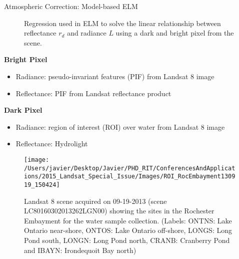 \documentclass{beamer}
\begin{document}
\begin{frame}{}
\begin{columns}[t]
\begin{column}{.3\linewidth}
\begin{block}{Atmospheric Correction: Model-based ELM}
\begin{figure}[htb]
{
  }%
\caption{Regression used in ELM to solve the linear relationship between reflectance $r_d$ and radiance $L$ using a dark and bright pixel from the scene. \label{fig:ELM}}
\end{figure}

{\large \bf Bright Pixel}
\begin{itemize}
    \item Radiance: pseudo-invariant features (PIF) from Landsat 8 image
    \vspace{0.5cm}
    \item Reflectance: PIF from Landsat reflectance product
\end{itemize}
\vspace{0.3cm}
{\large \bf Dark Pixel}

\begin{itemize}
    \item Radiance: region of interest (ROI) over water from Landsat 8 image
    \vspace{0.5cm}
    \item Reflectance: Hydrolight
\end{itemize}
\vspace{1cm}

\begin{figure}[htb]
  \centering
  \texttt{[image: /Users/javier/Desktop/Javier/PHD\_RIT/ConferencesAndApplications/2015\_Landsat\_Special\_Issue/Images/ROI\_RocEmbayment130919\_150424]}
  \caption{Landsat 8 scene acquired on 09-19-2013 (scene LC80160302013262LGN00) showing the sites in the Rochester Embayment for the water sample collection. (Labels: ONTNS: Lake Ontario near-shore, ONTOS: Lake Ontario off-shore, LONGS: Long Pond south, LONGN: Long Pond north, CRANB: Cranberry Pond and IBAYN: Irondequoit Bay north)\label{fig:091913Sites} } 
\end{figure}


\end{block}
\end{column}
\end{columns}
\end{frame}
\end{document}
